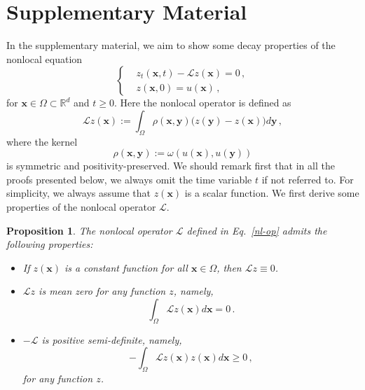 \documentclass{article}
\newtheorem{proposition}[theorem]{Proposition}
\newcommand{\xb}{\bm{x}}
\newcommand{\yb}{\bm{y}}
\begin{document}
\section*{Supplementary Material}
In the supplementary material, we aim to show some decay properties of the nonlocal equation
\begin{equation}\label{nl-eq-con}
\left\{
\begin{aligned}
&z_t(\xb,t)-\mathcal{L} z(\xb)=0\,,\\
& z(\xb,0)=u(\xb)\,,
\end{aligned}
\right.
\end{equation}
for $\xb\in\Omega\subset\mathbb{R}^d$ and $t\ge 0$. Here the nonlocal operator is defined as
\begin{equation}\label{nl-op}
\mathcal{L}z(\xb) := \int_\Omega \rho(\xb,\yb)\big(z(\yb)-z(\xb)\big)d\yb\,,
\end{equation}
where the kernel
\begin{equation}
\rho(\xb,\yb):=\omega(u(\xb),u(\yb))
\end{equation}
is symmetric and positivity-preserved. We should remark first that in all the proofs presented below, we always omit the time variable $t$ if not referred to. For simplicity, we always assume that $z(\xb)$ is a scalar function. 
We first derive some properties of the nonlocal operator $\mathcal{L}$.
\begin{proposition}
The nonlocal operator $\mathcal{L}$ defined in Eq.~\eqref{nl-op} admits the following properties:
\begin{itemize}
\item[(i)] If $z(\xb)$ is a constant function for all $\xb\in\Omega$, then $\mathcal{L}z\equiv 0$.
\item[(ii)] $\mathcal{L}z$ is mean zero for any function $z$, namely,
\begin{equation}
\int_\Omega \mathcal{L} z(\xb) d\xb = 0\,.
\end{equation}
\item[(iii)] $-\mathcal{L}$ is positive semi-definite, namely,
\begin{equation}
-\int_\Omega \mathcal{L} z(\xb) z(\xb) d\xb \ge 0\,,
\end{equation}
for any function $z$.
\end{itemize}
\end{proposition}
\end{document}
